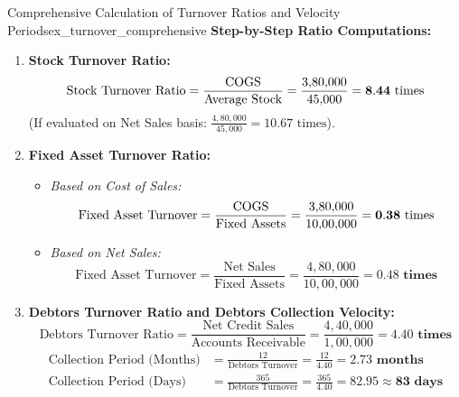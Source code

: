 \begin{example}{Comprehensive Calculation of Turnover Ratios and Velocity Periods}{ex_turnover_comprehensive}
\tcbline
\textbf{Step-by-Step Ratio Computations:}
\begin{enumerate}[leftmargin=*]
    \item \textbf{Stock Turnover Ratio:}
    \begin{equation*}
        \text{Stock Turnover Ratio} = \frac{\operatorname{COGS}}{\text{Average Stock}} = \frac{3{,}80{,}000}{45{,}000} = \mathbf{8.44 \text{ times}}
    \end{equation*}
    (If evaluated on Net Sales basis: $\frac{4,80,000}{45,000} = 10.67 \text{ times}$).

    \item \textbf{Fixed Asset Turnover Ratio:}
    \begin{itemize}[noitemsep]
        \item \textit{Based on Cost of Sales:}
        \begin{equation*}
            \text{Fixed Asset Turnover} = \frac{\operatorname{COGS}}{\text{Fixed Assets}} = \frac{3{,}80{,}000}{10{,}00{,}000} = \mathbf{0.38 \text{ times}}
        \end{equation*}
        \item \textit{Based on Net Sales:}
        \begin{equation*}
            \text{Fixed Asset Turnover} = \frac{\text{Net Sales}}{\text{Fixed Assets}} = \frac{4{,}80{,}000}{10{,}00{,}000} = \mathbf{0.48 \text{ times}}
        \end{equation*}
    \end{itemize}

    \item \textbf{Debtors Turnover Ratio and Debtors Collection Velocity:}
    \begin{equation*}
        \text{Debtors Turnover Ratio} = \frac{\text{Net Credit Sales}}{\text{Accounts Receivable}} = \frac{4{,}40{,}000}{1{,}00{,}000} = \mathbf{4.40 \text{ times}}
    \end{equation*}
    \begin{align*}
        \text{Collection Period (Months)} &= \frac{12}{\text{Debtors Turnover}} = \frac{12}{4.40} = \mathbf{2.73 \text{ months}} \\[0.4em]
        \text{Collection Period (Days)} &= \frac{365}{\text{Debtors Turnover}} = \frac{365}{4.40} = \mathbf{82.95 \approx 83 \text{ days}}
    \end{align*}


\end{enumerate}
\end{example}
